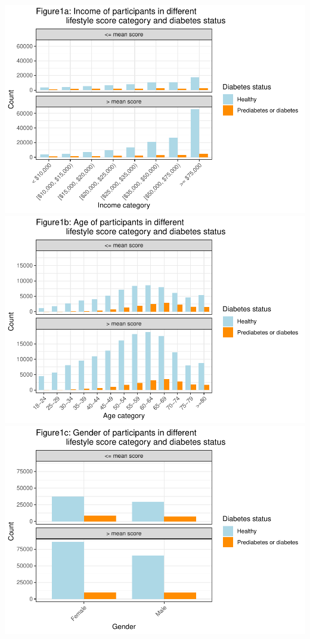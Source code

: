 \documentclass[
  12pt,
]{article}
\begin{document}
\includegraphics{template_files/figure-latex/unnamed-chunk-4-1.pdf}
\includegraphics{template_files/figure-latex/unnamed-chunk-4-2.pdf}
\includegraphics{template_files/figure-latex/unnamed-chunk-4-3.pdf}
\end{document}
